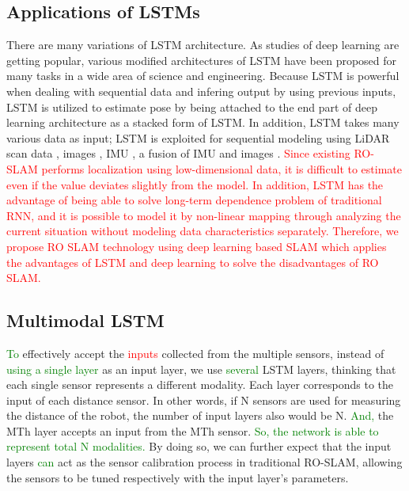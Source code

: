 \documentclass{ieeeaccess}
\begin{document}
\subsection{Applications of LSTMs}

There are many variations of LSTM architecture. As studies of deep learning are getting popular, various modified architectures of LSTM have been proposed for many tasks in a wide area of science and engineering. Because LSTM is powerful when dealing with sequential data and infering output by using previous inputs, LSTM is utilized to estimate pose by being attached to the end part of deep learning architecture \cite{wang2017deepvo, kendall2015posenet, turan2018deep}  as a stacked form of LSTM. In addition, LSTM takes many various data as input; LSTM is exploited for sequential modeling using LiDAR scan data \cite{gladh2016deep}, images \cite{walch2017image, wang2017deepvo}, IMU \cite{ordonez2016deep}, a fusion of IMU and images \cite{clark2017vinet}. \textcolor{red}{Since existing RO-SLAM performs localization using low-dimensional data, it is difficult to estimate even if the value deviates slightly from the model. In addition, LSTM has the advantage of being able to solve long-term dependence problem of traditional RNN, and it is possible to model it by non-linear mapping through analyzing the current situation without modeling data characteristics separately. Therefore, we propose RO SLAM technology using deep learning based SLAM which applies the advantages of LSTM and deep learning to solve the disadvantages of RO SLAM.}



\subsection{Multimodal LSTM}

\textcolor{green}{To} effectively accept the \textcolor{red}{inputs} collected from the multiple sensors, instead of \textcolor{green}{using a single layer} as an input layer, we use \textcolor{green}{several} LSTM layers, thinking that each single sensor represents a different modality. Each layer corresponds to the input of each distance sensor. In other words, if N sensors are used for measuring the distance of the robot, the number of input layers also would be N. \textcolor{green}{And,} the MTh layer accepts an input from the MTh sensor. \textcolor{green}{So, the network is able to represent total N modalities.} By doing so, we can further expect that the input layers \textcolor{green}{can} act as the sensor calibration process in traditional RO-SLAM, allowing the sensors to be tuned respectively with the input layer’s parameters.
\end{document}
